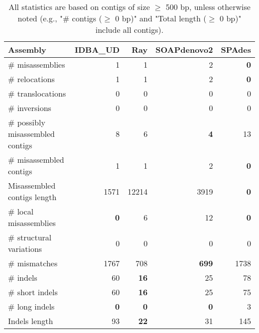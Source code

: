\documentclass[12pt,a4paper]{article}
\begin{document}
\begin{table}[ht]
\begin{center}
\caption{All statistics are based on contigs of size $\geq$ 500 bp, unless otherwise noted (e.g., "\# contigs ($\geq$ 0 bp)" and "Total length ($\geq$ 0 bp)" include all contigs).}
\begin{tabular}{|l*{4}{|r}|}
\hline
Assembly & IDBA\_UD & Ray & SOAPdenovo2 & SPAdes \\ \hline
\# misassemblies & 1 & 1 & 2 & {\bf 0} \\ \hline
\hspace{5mm}\# relocations & 1 & 1 & 2 & {\bf 0} \\ \hline
\hspace{5mm}\# translocations & 0 & 0 & 0 & 0 \\ \hline
\hspace{5mm}\# inversions & 0 & 0 & 0 & 0 \\ \hline
\# possibly misassembled contigs & 8 & 6 & {\bf 4} & 13 \\ \hline
\# misassembled contigs & 1 & 1 & 2 & {\bf 0} \\ \hline
Misassembled contigs length & 1571 & 12214 & 3919 & {\bf 0} \\ \hline
\# local misassemblies & {\bf 0} & 6 & 12 & {\bf 0} \\ \hline
\# structural variations & 0 & 0 & 0 & 0 \\ \hline
\# mismatches & 1767 & 708 & {\bf 699} & 1738 \\ \hline
\# indels & 60 & {\bf 16} & 25 & 78 \\ \hline
\hspace{5mm}\# short indels & 60 & {\bf 16} & 25 & 75 \\ \hline
\hspace{5mm}\# long indels & {\bf 0} & {\bf 0} & {\bf 0} & 3 \\ \hline
Indels length & 93 & {\bf 22} & 31 & 145 \\ \hline
\end{tabular}
\end{center}
\end{table}
\end{document}
